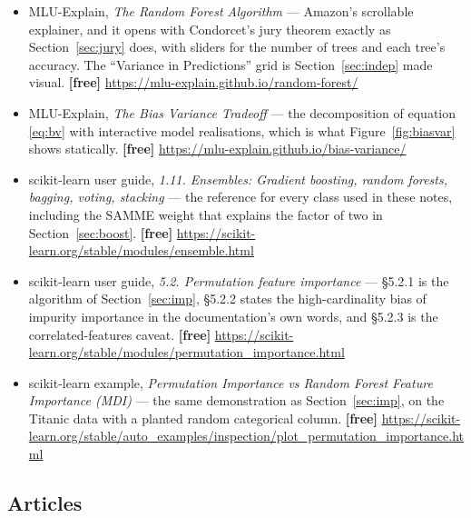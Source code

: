\documentclass[11pt]{article}
\begin{document}
\begin{itemize}[leftmargin=*]
  \item MLU-Explain, \emph{The Random Forest Algorithm} --- Amazon's scrollable
    explainer, and it opens with Condorcet's jury theorem exactly as
    Section~\ref{sec:jury} does, with sliders for the number of trees and each
    tree's accuracy. The ``Variance in Predictions'' grid is
    Section~\ref{sec:indep} made visual. \textbf{[free]}
    \url{https://mlu-explain.github.io/random-forest/}
  \item MLU-Explain, \emph{The Bias Variance Tradeoff} --- the decomposition of
    equation \eqref{eq:bv} with interactive model realisations, which is what
    Figure~\ref{fig:biasvar} shows statically. \textbf{[free]}
    \url{https://mlu-explain.github.io/bias-variance/}
  \item scikit-learn user guide, \emph{1.11. Ensembles: Gradient boosting,
    random forests, bagging, voting, stacking} --- the reference for every
    class used in these notes, including the SAMME weight that explains the
    factor of two in Section~\ref{sec:boost}. \textbf{[free]}
    \url{https://scikit-learn.org/stable/modules/ensemble.html}
  \item scikit-learn user guide, \emph{5.2. Permutation feature importance} ---
    \S5.2.1 is the algorithm of Section~\ref{sec:imp}, \S5.2.2 states the
    high-cardinality bias of impurity importance in the documentation's own
    words, and \S5.2.3 is the correlated-features caveat. \textbf{[free]}
    \url{https://scikit-learn.org/stable/modules/permutation_importance.html}
  \item scikit-learn example, \emph{Permutation Importance vs Random Forest
    Feature Importance (MDI)} --- the same demonstration as
    Section~\ref{sec:imp}, on the Titanic data with a planted random
    categorical column. \textbf{[free]}
    \url{https://scikit-learn.org/stable/auto_examples/inspection/plot_permutation_importance.html}
\end{itemize}

\subsection*{Articles}
\end{document}
